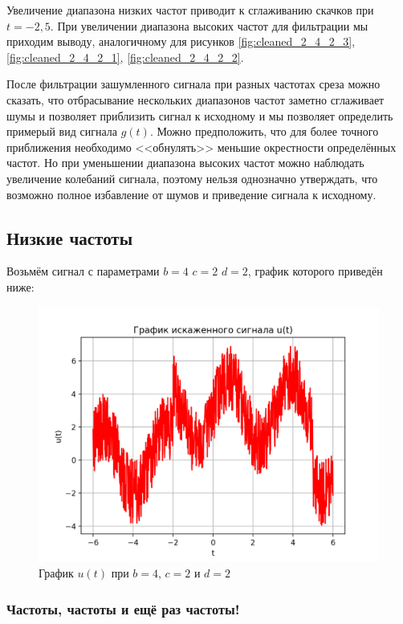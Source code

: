 \clearpage

Увеличение диапазона низких частот приводит к сглаживанию скачков при $t=-2, 5$. При увеличении диапазона высоких частот для фильтрации мы приходим выводу, аналогичному для рисунков \ref{fig:cleaned_2_4_2_3}, \ref{fig:cleaned_2_4_2_1}, \ref{fig:cleaned_2_4_2_2}.

После фильтрации зашумленного сигнала при разных частотах среза можно сказать, что отбрасывание нескольких диапазонов частот заметно сглаживает шумы и позволяет приблизить сигнал к исходному и мы позволяет определить примерый вид сигнала $g(t)$. Можно предположить, что для более точного приближения необходимо <<обнулять>> меньшие окрестности определённых частот. Но при уменьшении диапазона высоких частот можно наблюдать увеличение колебаний сигнала, поэтому нельзя однозначно утверждать, что возможно полное избавление от шумов и приведение сигнала к исходному.
\clearpage

\subsection{Низкие частоты}

Возьмём сигнал с параметрами $b=4$ $c=2$ $d=2$, график которого приведён ниже:

\begin{figure}[ht!]
    \centering
    \includegraphics[scale=0.5]{media/1 task/low_freq/Noisy_4_2_2.png}
    \caption{График $u(t)$ при $b=4$, $c=2$ и $d=2$}
    \label{fig:noisy_4_2_2}
\end{figure}

\subsubsection{Частоты, частоты и ещё раз частоты!}

